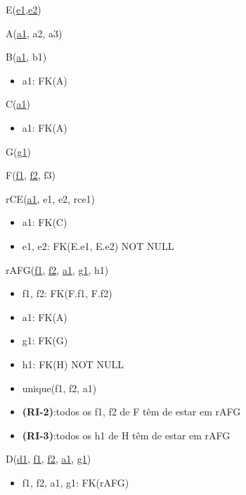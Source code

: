 \documentclass[12pt,a4paper]{article}
\begin{document}
  \vspace*{10pt}
  \noindent
  E(\underline{e1},\underline{e2})

  \vspace*{10pt}
  \noindent
  A(\underline{a1}, a2, a3)

  \vspace*{10pt}
  \noindent
  B(\underline{a1}, b1)
  \begin{itemize}[nosep]
      \item[]a1: FK(A)
  \end{itemize}

  \vspace*{10pt}
  \noindent
  C(\underline{a1})
  \begin{itemize}[nosep]
      \item[]a1: FK(A)
  \end{itemize}

  \vspace*{10pt}
  \noindent
  G(\underline{g1})

  \vspace*{10pt}
  \noindent
  F(\underline{f1}, \underline{f2}, f3)

  \vspace*{10pt}
  \noindent
  rCE(\underline{a1}, e1, e2, rce1)
  \begin{itemize}[nosep]
      \item[]a1: FK(C)
      \item[]e1, e2: FK(E.e1, E.e2) NOT NULL
  \end{itemize}

  \vspace*{10pt}
  \noindent
  rAFG(\underline{f1}, \underline{f2}, \underline{a1}, \underline{g1}, h1)
  \begin{itemize}[nosep]
      \item[]f1, f2: FK(F.f1, F.f2)
      \item[]a1: FK(A)
      \item[]g1: FK(G)
      \item[]h1: FK(H) NOT NULL 
      \item[] unique(f1, f2, a1)
      \item[]\textsf{\textbf{(RI-2)}}:todos os f1, f2 de F têm de estar em rAFG
      \item[]\textsf{\textbf{(RI-3)}}:todos os h1 de H têm de estar em rAFG
  \end{itemize}

  \vspace*{10pt}
  \noindent
  D(\underline{d1}, \underline{f1}, \underline{f2}, \underline{a1}, \underline{g1})
  \begin{itemize}[nosep]
      \item[]f1, f2, a1, g1: FK(rAFG)
  \end{itemize}
\rmfamily
\vspace*{20pt}
\noindent
\end{document}
